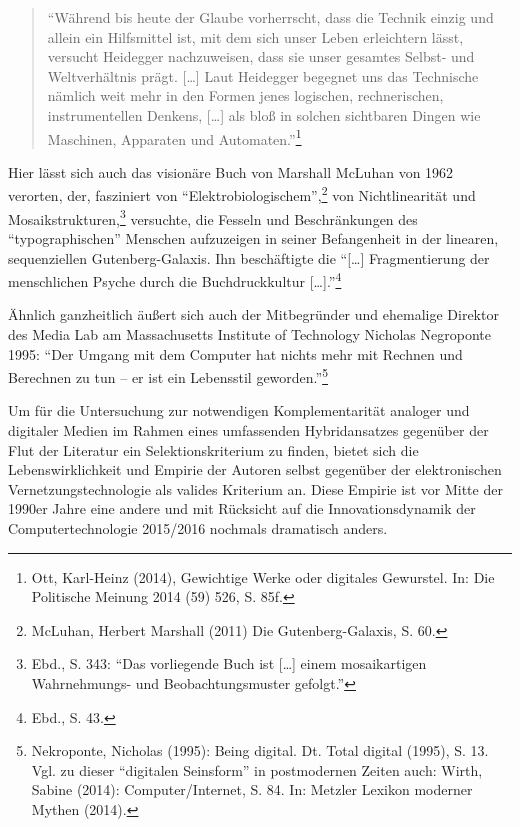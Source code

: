 \documentclass[a4paper,
fontsize=11pt,
oneside,
numbers=noperiodatend,
parskip=half-,
bibliography=totoc,
final
]{scrartcl}
\begin{document}
\begin{quote}
\enquote{Während bis heute der Glaube vorherrscht, dass die Technik
einzig und allein ein Hilfsmittel ist, mit dem sich unser Leben
erleichtern lässt, versucht Heidegger nachzuweisen, dass sie unser
gesamtes Selbst- und Weltverhältnis prägt. {[}\ldots{}{]} Laut Heidegger
begegnet uns das Technische nämlich weit mehr in den Formen jenes
logischen, rechnerischen, instrumentellen Denkens, {[}\ldots{}{]} als
bloß in solchen sichtbaren Dingen wie Maschinen, Apparaten und
Automaten.}\footnote{Ott, Karl-Heinz (2014), Gewichtige Werke oder
  digitales Gewurstel. In: Die Politische Meinung 2014 (59) 526, S. 85f.}
\end{quote}

Hier lässt sich auch das visionäre Buch von Marshall McLuhan von 1962
verorten, der, fasziniert von \enquote{Elektrobiologischem},\footnote{McLuhan,
  Herbert Marshall (2011) Die Gutenberg-Galaxis, S. 60.} von
Nichtlinearität und Mosaikstrukturen,\footnote{Ebd., S. 343:
  \enquote{Das vorliegende Buch ist {[}\ldots{}{]} einem mosaikartigen
  Wahrnehmungs- und Beobachtungsmuster gefolgt.}} versuchte, die Fesseln
und Beschränkungen des \enquote{typographischen} Menschen aufzuzeigen in
seiner Befangenheit in der linearen, sequenziellen Gutenberg-Galaxis.
Ihn beschäftigte die \enquote{{[}\ldots{}{]} Fragmentierung der
menschlichen Psyche durch die Buchdruckkultur {[}\ldots{}{]}.}\footnote{Ebd.,
  S. 43.}

Ähnlich ganzheitlich äußert sich auch der Mitbegründer und ehemalige
Direktor des Media Lab am Massachusetts Institute of Technology Nicholas
Negroponte 1995: \enquote{Der Umgang mit dem Computer hat nichts mehr
mit Rechnen und Berechnen zu tun -- er ist ein Lebensstil
geworden.}\footnote{Nekroponte, Nicholas (1995): Being digital. Dt.
  Total digital (1995), S. 13. Vgl. zu dieser \enquote{digitalen
  Seinsform} in postmodernen Zeiten auch: Wirth, Sabine (2014):
  Computer/Internet, S. 84. In: Metzler Lexikon moderner Mythen (2014).}

Um für die Untersuchung zur notwendigen Komplementarität analoger und
digitaler Medien im Rahmen eines umfassenden Hybridansatzes gegenüber
der Flut der Literatur ein Selektionskriterium zu finden, bietet sich
die Lebenswirklichkeit und Empirie der Autoren selbst gegenüber der
elektronischen Vernetzungstechnologie als valides Kriterium an. Diese
Empirie ist vor Mitte der 1990er Jahre eine andere und mit Rücksicht auf
die Innovationsdynamik der Computertechnologie 2015/2016 nochmals
dramatisch anders.
\end{document}
